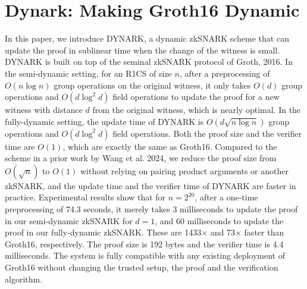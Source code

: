 \documentclass[11pt,oneside]{book}
\theoremstyle{definition}
\theoremstyle{remark}
\theoremstyle{plain}
\begin{document}
\section{\cite{cryptoeprint:2025/1897} Dynark: Making Groth16 Dynamic}
 In this paper, we introduce DYNARK, a dynamic zkSNARK scheme that can update the proof in sublinear time when the change of the witness is small. DYNARK is built on top of the seminal zkSNARK protocol of Groth, 2016. In the semi-dynamic setting, for an R1CS of size $n$, after a preprocessing of $O(n\log n)$ group operations on the original witness, it only takes $O(d)$ group operations and $O(d\log^2 d)$ field operations to update the proof for a new witness with distance $d$ from the original witness, which is nearly optimal. In the fully-dynamic setting, the update time of DYNARK is $O(d\sqrt{n\log n})$ group operations and $O(d\log^2 d)$ field operations. Both the proof size and the verifier time are $O(1)$, which are exactly the same as Groth16. Compared to the scheme in a prior work by Wang et al. 2024, we reduce the proof size from $O(\sqrt{n})$ to $O(1)$ without relying on pairing product arguments or another zkSNARK, and the update time and the verifier time of DYNARK are faster in practice. Experimental results show that for $n=2^{20}$, after a one-time preprocessing of 74.3 seconds, it merely takes 3 milliseconds to update the proof in our semi-dynamic zkSNARK for $d=1$, and 60 milliseconds to update the proof in our fully-dynamic zkSNARK. These are 1433$\times$ and 73$\times$ faster than Groth16, respectively. The proof size is 192 bytes and the verifier time is 4.4 milliseconds. The system is fully compatible with any existing deployment of Groth16 without changing the trusted setup, the proof and the verification algorithm.
 
\end{document}
